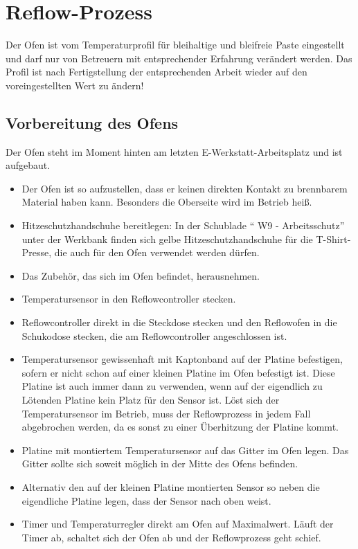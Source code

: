 \documentclass{\basedir/fablab-document}
\begin{document}
\section{Reflow-Prozess}
Der Ofen ist vom Temperaturprofil für bleihaltige und bleifreie Paste eingestellt und darf nur von Betreuern mit entsprechender Erfahrung verändert werden. Das Profil ist nach Fertigstellung der entsprechenden Arbeit wieder auf den voreingestellten Wert zu ändern!

\subsection{Vorbereitung des Ofens}
Der Ofen steht im Moment hinten am letzten E-Werkstatt-Arbeitsplatz und ist aufgebaut.
\begin{itemize}
	\item Der Ofen ist so aufzustellen, dass er keinen direkten Kontakt zu brennbarem Material haben kann. Besonders die Oberseite wird im Betrieb heiß.
	\item Hitzeschutzhandschuhe bereitlegen: In der Schublade \enquote{ W9 - Arbeitsschutz} unter der Werkbank finden sich gelbe Hitzeschutzhandschuhe für die T-Shirt-Presse, die auch für den Ofen verwendet werden dürfen.
	\item Das Zubehör, das sich im Ofen befindet, herausnehmen.
	\item Temperatursensor in den Reflowcontroller stecken.
	\item Reflowcontroller direkt in die Steckdose stecken und den Reflowofen in die Schukodose stecken, die am Reflowcontroller angeschlossen ist.
	\item Temperatursensor gewissenhaft mit Kaptonband auf der Platine befestigen, sofern er nicht schon auf einer kleinen Platine im Ofen befestigt ist. Diese Platine ist auch immer dann zu verwenden, wenn auf der eigendlich zu Lötenden Platine kein Platz für den Sensor ist. Löst sich der Temperatursensor im Betrieb, muss der Reflowprozess in jedem Fall abgebrochen werden, da es sonst zu einer Überhitzung der Platine kommt.
	\item Platine mit montiertem Temperatursensor auf das Gitter im Ofen legen. Das Gitter sollte sich soweit möglich in der Mitte des Ofens befinden.
	\item Alternativ den auf der kleinen Platine montierten Sensor so neben die eigendliche Platine legen, dass der Sensor nach oben weist.
	\item Timer und Temperaturregler direkt am Ofen auf Maximalwert. Läuft der Timer ab, schaltet sich der Ofen ab und der Reflowprozess geht schief.
\end{itemize}
\end{document}
